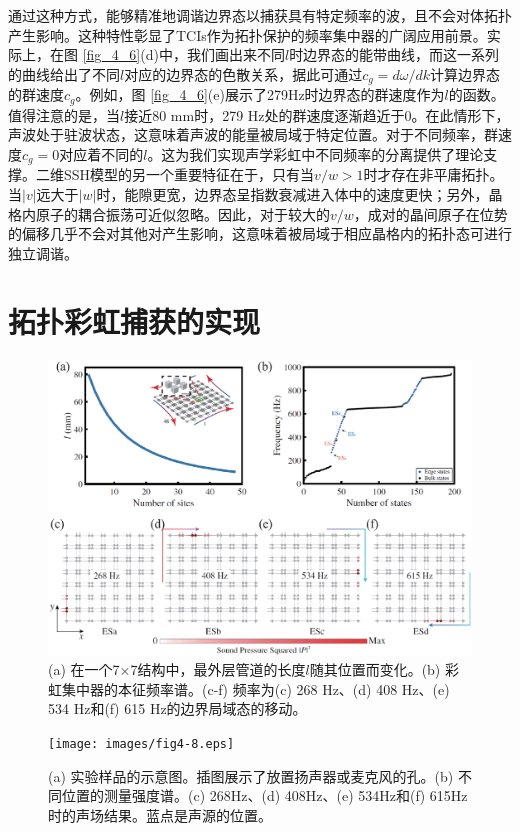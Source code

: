 通过这种方式，能够精准地调谐边界态以捕获具有特定频率的波，且不会对体拓扑产生影响。这种特性彰显了TCIs作为拓扑保护的频率集中器的广阔应用前景。实际上，在图 \ref{fig_4_6}(d)中，我们画出来不同$l$时边界态的能带曲线，而这一系列的曲线给出了不同$l$对应的边界态的色散关系，据此可通过$c_g = d\omega/dk$计算边界态的群速度$c_g$。例如，图 \ref{fig_4_6}(e)展示了279Hz时边界态的群速度作为$l$的函数。值得注意的是，当$l$接近80 mm时，279 Hz处的群速度逐渐趋近于0。在此情形下，声波处于驻波状态，这意味着声波的能量被局域于特定位置。对于不同频率，群速度$c_g = 0$对应着不同的$l$。这为我们实现声学彩虹中不同频率的分离提供了理论支撑。二维SSH模型的另一个重要特征在于，只有当$v/w > 1$时才存在非平庸拓扑。当$|v|$远大于$|w|$时，能隙更宽，边界态呈指数衰减进入体中的速度更快；另外，晶格内原子的耦合振荡可近似忽略。因此，对于较大的$v/w$，成对的晶间原子在位势的偏移几乎不会对其他对产生影响，这意味着被局域于相应晶格内的拓扑态可进行独立调谐。

\section{拓扑彩虹捕获的实现}

\begin{figure}[h!]
    \centering
    \includegraphics[width=1\textwidth]{images/fig4-7.eps} 
    \caption{(a) 在一个7×7结构中，最外层管道的长度$l$随其位置而变化。(b) 彩虹集中器的本征频率谱。(c-f) 频率为(c) 268 Hz、(d) 408 Hz、(e) 534 Hz和(f) 615 Hz的边界局域态的移动。}
    \label{fig_4_7}
\end{figure} 

\begin{figure}[h!]
    \centering
    \texttt{[image: images/fig4-8.eps]} 
    \caption{(a) 实验样品的示意图。插图展示了放置扬声器或麦克风的孔。(b) 不同位置的测量强度谱。(c) 268Hz、(d) 408Hz、(e) 534Hz和(f) 615Hz时的声场结果。蓝点是声源的位置。}
    \label{fig_4_8}
\end{figure} 

